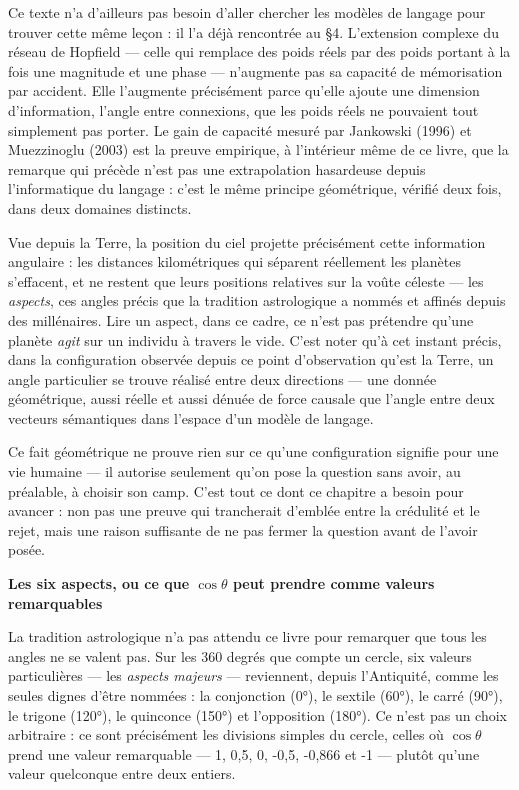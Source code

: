 \documentclass[french, 11pt, twoside, openright, a5paper]{book}
\begin{document}
Ce texte n'a d'ailleurs pas besoin d'aller chercher les modèles de
langage pour trouver cette même leçon : il l'a déjà rencontrée au §4.
L'extension complexe du réseau de Hopfield --- celle qui remplace des
poids réels par des poids portant à la fois une magnitude et une phase
--- n'augmente pas sa capacité de mémorisation par accident. Elle
l'augmente précisément parce qu'elle ajoute une dimension d'information,
l'angle entre connexions, que les poids réels ne pouvaient tout
simplement pas porter. Le gain de capacité mesuré par Jankowski (1996)
et Muezzinoglu (2003) est la preuve empirique, à l'intérieur même de ce
livre, que la remarque qui précède n'est pas une extrapolation
hasardeuse depuis l'informatique du langage : c'est le même principe
géométrique, vérifié deux fois, dans deux domaines distincts.

Vue depuis la Terre, la position du ciel projette précisément cette
information angulaire : les distances kilométriques qui séparent
réellement les planètes s'effacent, et ne restent que leurs positions
relatives sur la voûte céleste --- les \emph{aspects}, ces angles précis
que la tradition astrologique a nommés et affinés depuis des
millénaires. Lire un aspect, dans ce cadre, ce n'est pas prétendre
qu'une planète \emph{agit} sur un individu à travers le vide. C'est
noter qu'à cet instant précis, dans la configuration observée depuis ce
point d'observation qu'est la Terre, un angle particulier se trouve
réalisé entre deux directions --- une donnée géométrique, aussi réelle
et aussi dénuée de force causale que l'angle entre deux vecteurs
sémantiques dans l'espace d'un modèle de langage.

Ce fait géométrique ne prouve rien sur ce qu'une configuration signifie
pour une vie humaine --- il autorise seulement qu'on pose la question
sans avoir, au préalable, à choisir son camp. C'est tout ce dont ce
chapitre a besoin pour avancer : non pas une preuve qui trancherait
d'emblée entre la crédulité et le rejet, mais une raison suffisante de
ne pas fermer la question avant de l'avoir posée.

\textbf{Les six aspects, ou ce que $\cos\theta$ peut prendre comme valeurs
remarquables}

La tradition astrologique n'a pas attendu ce livre pour remarquer que
tous les angles ne se valent pas. Sur les 360 degrés que compte un
cercle, six valeurs particulières --- les \emph{aspects majeurs} ---
reviennent, depuis l'Antiquité, comme les seules dignes d'être nommées :
la conjonction (0°), le sextile (60°), le carré (90°), le trigone
(120°), le quinconce (150°) et l'opposition (180°). Ce n'est pas un
choix arbitraire : ce sont précisément les divisions simples du cercle,
celles où $\cos\theta$ prend une valeur remarquable --- 1, 0,5, 0, -0,5, -0,866
et -1 --- plutôt qu'une valeur quelconque entre deux entiers.
\end{document}
